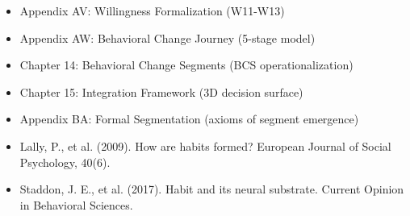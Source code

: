 \documentclass[11pt, a4paper]{article}
\begin{document}
\begin{itemize}
    \item Appendix AV: Willingness Formalization (W11-W13)
    \item Appendix AW: Behavioral Change Journey (5-stage model)
    \item Chapter 14: Behavioral Change Segments (BCS operationalization)
    \item Chapter 15: Integration Framework (3D decision surface)
    \item Appendix BA: Formal Segmentation (axioms of segment emergence)
    \item Lally, P., et al. (2009). How are habits formed? European Journal of Social Psychology, 40(6).
    \item Staddon, J. E., et al. (2017). Habit and its neural substrate. Current Opinion in Behavioral Sciences.
\end{itemize}
\end{document}
